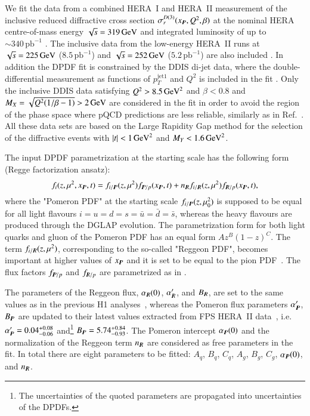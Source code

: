 \documentclass[12pt]{article}
\begin{document}
We fit the data from a combined HERA~I and HERA~II measurement of the inclusive reduced diffractive cross section $\sigma_r^{D(3)}(x_{I\!\!P}, Q^2, \beta)$  at the nominal HERA centre-of-mass energy $\sqrt{s} = 319\,\mathrm{GeV}$ and integrated luminosity of up to $\sim\!\! 340\,\text{pb}^{-1}$  \cite{Aaron:2012ad}.
The inclusive data from the low-energy HERA~II runs at $\sqrt{s} = 225\,\mathrm{GeV}$ ($8.5\,\text{pb}^{-1}$) and $\sqrt{s} = 252\,\mathrm{GeV}$ ($5.2\,\text{pb}^{-1}$) are also included \cite{Aaron:2012zz}.
In addition the DPDF fit is constrained by the DDIS di-jet data, where the double-differential measurement as functions of $p_T^{\mathrm{jet}1}$ and $Q^2$ is included in the fit \cite{Andreev:2014yra}.
Only the inclusive DDIS data satisfying $Q^2 > 8.5\, \mathrm{GeV}^2$ and $\beta < 0.8$ and $M_X = \sqrt{Q^2(1/\beta - 1)} > 2\,\mathrm{GeV}$ are considered in the fit in order to avoid the region of the phase space where pQCD predictions are less reliable, similarly as in Ref.~\cite{Aktas:2006hy}.
All these data sets are based on the Large Rapidity Gap method for the selection of the diffractive events with $|t| < 1\,\mathrm{GeV}^2$ and $M_Y < 1.6\,\mathrm{GeV}^2$.


The input DPDF parametrization at the starting scale has the following form (Regge factorization ansatz):
\begin{equation}
f_i (z, \mu^2, \xpom, t) = f_{i/\IP} (z, \mu^2) f_{\IP/p} (\xpom, t) + n_{\IR} f_{i/\IR} (z, \mu^2) f_{\IR/p} (\xpom, t),
\end{equation}
where the "Pomeron PDF" at the starting scale  $f_{i/I\!\!P}(z, \mu_0^2)$ is supposed to be equal for all light flavours $i=u=d=s = \bar{u} = \bar{d} = \bar{s}$, whereas the heavy flavours are produced through the DGLAP evolution.
The parametrization form for both light quarks and gluon of the Pomeron PDF has an equal form $A z^B (1-z)^C$.
The term $f_{i/I\!\!R} (z, \mu^2)$, corresponding to the so-called "Reggeon PDF", becomes important at higher values of $x_{I\!\!P}$ and it is set to be equal to the pion PDF~\cite{Owens:1984zj}.
The flux factors $f_{I\!\!P/p}$ and $f_{I\!\!R/p}$ are parametrized as in \cite{Aktas:2006hy,Aktas:2007bv}.

The parameters of the Reggeon flux, $\alpha_{I\!\!R}(0)$,  $\alpha'_{I\!\!R}$, and $B_{I\!\!R}$,  are set to the same values as in the previous H1 analyses~\cite{Aktas:2006hy,Aktas:2007bv}, whereas the Pomeron flux parameters $\alpha'_{I\!\!P}$, $B_{I\!\!P}$ are updated to their latest values extracted from FPS HERA~II data~\cite{Aaron:2010aa}, i.e. $\alpha'_{I\!\!P} = 0.04^{+0.08}_{-0.06}$ and\footnote{The uncertainties of the quoted parameters are propagated into uncertainties of the DPDFs.} $B_{I\!\!P} = 5.74^{+0.84}_{-0.93}$.
The Pomeron intercept $\alpha_{I\!\!P}(0)$ and the normalization of the Reggeon term $n_{I\!\!R}$ are considered as free parameters in the fit.
In total there are eight parameters to be fitted: $A_q$, $B_q$, $C_q$, $A_g$, $B_g$, $C_g$, $\alpha_{I\!\!P}(0)$, and $n_{I\!\!R}$.
\end{document}

